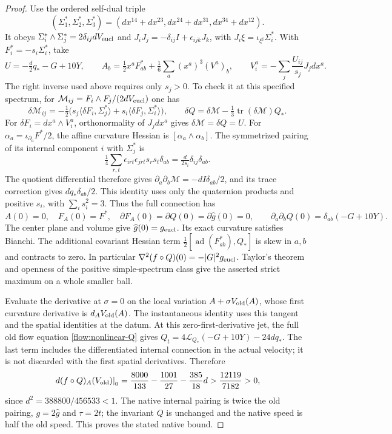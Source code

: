 \documentclass[11pt]{article}
\numberwithin{equation}{section}
\theoremstyle{definition}
\theoremstyle{remark}
\DeclareMathOperator{\tr}{tr}
\begin{document}
\begin{proof}
Use the ordered self-dual triple
\[
 (\Sigma_1^*,\Sigma_2^*,\Sigma_3^*)
  =(dx^{14}+dx^{23},dx^{24}+dx^{31},dx^{34}+dx^{12}).
\]
It obeys \(\Sigma_i^*\wedge\Sigma_j^*=2\delta_{ij}dV_{\rm eucl}\)
and \(J_iJ_j=-\delta_{ij}I+\epsilon_{ijk}J_k\), with
\(J_i\xi=\iota_{\xi^\sharp}\Sigma_i^*\).
With \(F_i^*=-s_i\Sigma_i^*\), take
\[
 U=-\tfrac d2q_*-G+10Y,\qquad
 A_b=\tfrac12x^aF^*_{ab}
        +\tfrac16\sum_a(x^a)^3(V^a)_b,\qquad
 V_i^a=-\sum_j\frac{U_{ij}}{s_j}J_jdx^a.
\]
The right inverse used above requires only \(s_j>0\).
To check it at this specified spectrum, for
\(\mathcal M_{ij}=F_i\wedge F_j/(2dV_{\rm eucl})\) one has
\[
 \delta\mathcal M_{ij}
 =-\tfrac12\bigl(s_j\langle\delta F_i,\Sigma_j^*\rangle
                 +s_i\langle\delta F_j,\Sigma_i^*\rangle\bigr),
 \qquad
 \delta Q=\delta\mathcal M
             -\tfrac13\tr(\delta\mathcal M)Q_*.
\]
For \(\delta F_i=dx^a\wedge V_i^a\), orthonormality of
\(J_jdx^a\) gives \(\delta\mathcal M=\delta Q=U\).
For \(\alpha_a=\iota_{\partial_a}F^*/2\), the affine
curvature Hessian is \([\alpha_a\wedge\alpha_b]\). The
symmetrized pairing of its internal component \(i\) with
\(\Sigma_j^*\) is
\[
 \tfrac14\sum_{r,t}\epsilon_{irt}\epsilon_{jrt}s_rs_t\delta_{ab}
       =\tfrac{d}{2s_i}\delta_{ij}\delta_{ab}.
\]
The quotient differential therefore gives
\(\partial_a\partial_b\mathcal M=-dI\delta_{ab}/2\),
and its trace correction gives \(dq_*\delta_{ab}/2\).
This identity uses only the quaternion products and positive
\(s_i\), with \(\sum_i s_i^2=3\). Thus the full connection has
\[
 A(0)=0,\quad F_A(0)=F^*,\quad
 \partial F_A(0)=\partial Q(0)=\partial\widehat g(0)=0,
 \qquad
 \partial_a\partial_bQ(0)=\delta_{ab}(-G+10Y).
\]
The center plane and volume give
\(\widehat g(0)=g_{\rm eucl}\).
Its exact curvature satisfies Bianchi. The additional
covariant Hessian term
\(\tfrac12[\operatorname{ad}(F^*_{ab}),Q_*]\) is skew in
\(a,b\) and contracts to zero. In particular
\(\nabla^2(f\circ Q)(0)=-|G|^2g_{\rm eucl}\).
Taylor's theorem and openness of the positive simple-spectrum
class give the asserted strict maximum on a whole smaller ball.

Evaluate the derivative at \(\sigma=0\) on the local
variation \(A+\sigma V_{\rm old}(A)\), whose first curvature
derivative is \(d_A V_{\rm old}(A)\). The instantaneous
identity uses this tangent and the spatial identities at the datum.
At this zero-first-derivative jet, the full old flow equation
\eqref{flow:nonlinear-Q} gives
\(Q_t=4\mathscr L_{Q_*}(-G+10Y)-24dq_*\).
The last term includes the differentiated internal connection
in the actual velocity; it is not discarded with the first
spatial derivatives. Therefore
\[
 \left.d(f\circ Q)_A(V_{\rm old})\right|_0
 =\frac{8000}{133}-\frac{1001}{27}-\frac{385}{18}d
 >\frac{12119}{7182}>0,
\]
since \(d^2=388800/456533<1\).
The native internal pairing is twice the old pairing,
\(g=2\widehat g\) and \(\tau=2t\); the invariant \(Q\)
is unchanged and the native speed is half the old speed.
This proves the stated native bound.
\end{proof}
\end{document}
